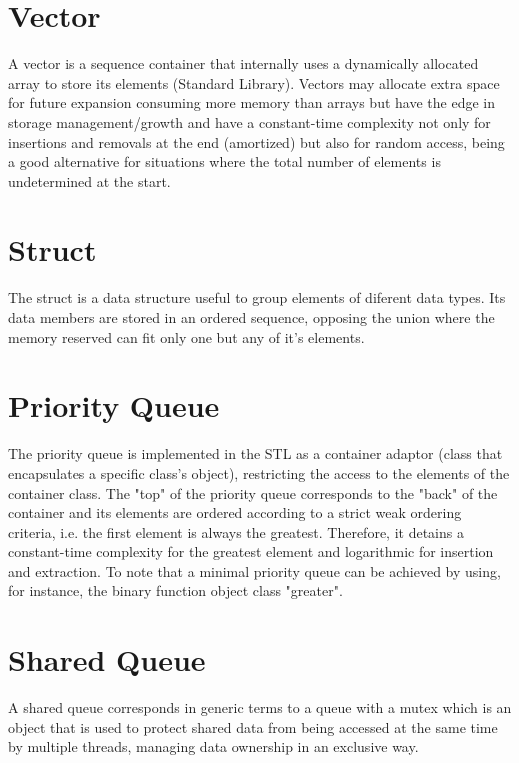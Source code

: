\section{Vector}
A vector is a sequence container that internally uses a dynamically allocated array to store its elements (Standard Library). Vectors may allocate extra space for future expansion consuming more memory than arrays but have the edge in storage management/growth and have a constant-time complexity not only for insertions and removals at the end (amortized) but also for random access, being a good alternative for situations where the total number of elements is undetermined at the start.

\section{Struct}
The struct is a data structure useful to group elements of diferent data types. Its data members are stored in an ordered sequence, opposing the union where the memory reserved can fit only one but any of it's elements.

\section{Priority Queue}
The priority queue is implemented in the STL as a container adaptor (class that encapsulates a specific class's object), restricting the access to the elements of the container class. The "top" of the priority queue corresponds to the "back" of the container and its elements are ordered according to a strict weak ordering criteria, i.e. the first element is always the greatest. Therefore, it detains a constant-time complexity for the greatest element and logarithmic for insertion and extraction.
To note that a minimal priority queue can be achieved by using, for instance, the binary function object class "greater".

\section{Shared Queue}
A shared queue corresponds in generic terms to a queue with a mutex which is an object that is used to protect shared data from being accessed at the same time by multiple threads, managing data ownership in an exclusive way.

